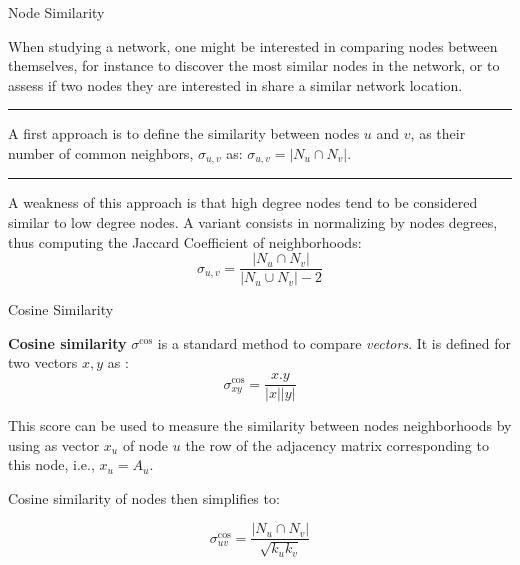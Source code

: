 











\begin{textbox}{Node Similarity}

When studying a network, one might be interested in comparing nodes between themselves, for instance to discover the most similar nodes in the network, or to assess if two nodes they are interested in share a similar network location. 

\noindent\rule{4cm}{0.1pt}

A first approach is to define the similarity between nodes $u$ and $v$, as their number of common neighbors, $\sigma_{u,v}$ as: $\sigma_{u,v}=|N_u \cap N_v|$. 


\noindent\rule{4cm}{0.1pt}

A weakness of this approach is that high degree nodes tend to be considered similar to low degree nodes.
A variant consists in normalizing by nodes degrees, thus computing the Jaccard Coefficient of neighborhoods: 
\[
\sigma_{u,v}= \frac{|N_u \cap N_v|}{|N_u \cup N_v|-2}
\]

\end{textbox}


\begin{textbox}{Cosine Similarity}

\textbf{Cosine similarity} $\sigma^{\cos}$ is a standard method to compare \textit{vectors}. It is defined for two vectors $x,y$ as :
\[
\sigma^{\cos}_{xy} = \frac{x.y}{|x||y|}
\]

This score can be used to measure the similarity between nodes neighborhoods by using as vector $x_u$ of node $u$ the row of the adjacency matrix corresponding to this node, i.e., $x_u=A_u$.

Cosine similarity of nodes then simplifies to:

\[
\sigma^{\cos}_{uv} = \frac{|N_u \cap N_v|}{\sqrt{k_u k_v}}
\]

\end{textbox}



